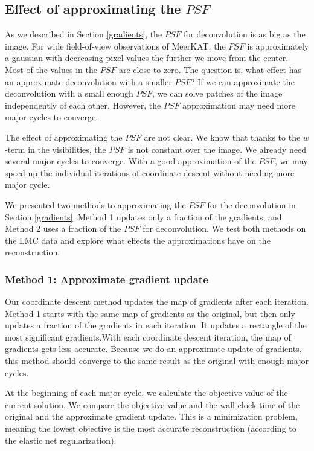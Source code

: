 \subsection{Effect of approximating the $PSF$} \label{results:gradients}
As we described in Section \ref{gradients}, the $PSF$ for deconvolution is as big as the image. For wide field-of-view observations of MeerKAT, the $PSF$ is approximately a gaussian with decreasing pixel values the further we move from the center. Most of the values in the $PSF$ are close to zero. The question is, what effect has an approximate deconvolution with a smaller $PSF$? If we can approximate the deconvolution with a small enough $PSF$, we can solve patches of the image independently of each other. However, the $PSF$ approximation may need more major cycles to converge.

The effect of approximating the $PSF$ are not clear. We know that thanks to the $w$-term in the visibilities, the $PSF$ is not constant over the image. We already need several major cycles to converge. With a good approximation of the $PSF$, we may speed up the individual iterations of coordinate descent without needing more major cycle.

We presented two methods to approximating the $PSF$ for the deconvolution in Section \ref{gradients}. Method 1 updates only a fraction of the gradients, and Method 2 uses a fraction of the $PSF$ for deconvolution. We test both methods on the LMC data and explore what effects the approximations have on the reconstruction.

\subsubsection{Method 1: Approximate gradient update}
Our coordinate descent method updates the map of gradients after each iteration.  Method 1 starts with the same map of gradients as the original, but then only updates a fraction of the gradients in each iteration. It updates a rectangle of the most significant gradients.With each coordinate descent iteration, the map of gradients gets less accurate. Because we do an approximate update of gradients, this method should converge to the same result as the original with enough major cycles.

At the beginning of each major cycle, we calculate the objective value of the current solution. We compare the objective value and the wall-clock time of the original and the approximate gradient update. This is a minimization problem, meaning the lowest objective is the most accurate reconstruction (according to the elastic net regularization).

